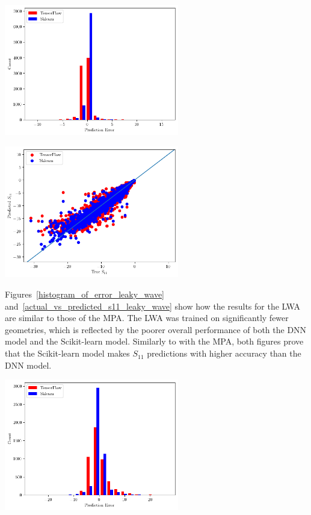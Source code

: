 \documentclass[conference]{IEEEtran}
\newenvironment{Figure}
    {\par\medskip\noindent\minipage{\linewidth}}
    {\endminipage\par\medskip}
\begin{document}
\begin{Figure}
    \centering
    \includegraphics[width=3in]{histogram_patch}
    \label{histogram_of_error_patch}
\end{Figure}

\begin{Figure}
    \centering
    \includegraphics[width=3in]{actual_vs_predicted_s11_patch}
    \label{actual_vs_predicted_s11_patch}
\end{Figure}

Figures~\ref{histogram_of_error_leaky_wave} and~\ref{actual_vs_predicted_s11_leaky_wave} show how the results for the LWA are similar to those of the MPA. The LWA was trained on significantly fewer geometries, which is reflected by the poorer overall performance of both the DNN model and the Scikit-learn model. Similarly to with the MPA, both figures prove that the Scikit-learn model makes $S_{11}$ predictions with higher accuracy than the DNN model.

\begin{Figure}
    \centering
    \includegraphics[width=3in]{histogram_leaky_wave}
    \label{histogram_of_error_leaky_wave}
\end{Figure}
\end{document}
